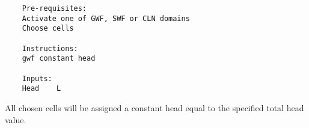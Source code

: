     \begin{verbatim}
    Pre-requisites:
    Activate one of GWF, SWF or CLN domains
    Choose cells

    Instructions:
    gwf constant head

    Inputs:
    Head    L
    \end{verbatim}

    All chosen cells will be assigned a constant head equal to the specified total head value.  